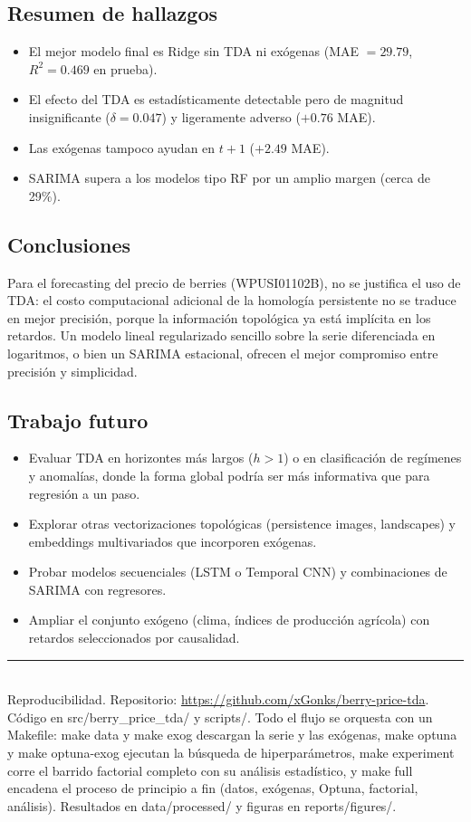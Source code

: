 \documentclass[11pt,a4paper]{article}
\begin{document}
\subsection*{Resumen de hallazgos}
\begin{itemize}[noitemsep]
  \item El mejor modelo final es Ridge sin TDA ni exógenas (MAE $=29.79$,
        $R^2=0.469$ en prueba).
  \item El efecto del TDA es estadísticamente detectable pero de magnitud
        insignificante ($\delta=0.047$) y ligeramente adverso ($+0.76$ MAE).
  \item Las exógenas tampoco ayudan en $t{+}1$ ($+2.49$ MAE).
  \item SARIMA supera a los modelos tipo RF por un amplio margen (cerca de 29\%).
\end{itemize}

\subsection*{Conclusiones}
Para el forecasting del precio de berries (WPUSI01102B), no se justifica el uso de
TDA: el costo computacional adicional de la homología persistente no se traduce en
mejor precisión, porque la información topológica ya está implícita en los
retardos. Un modelo lineal regularizado sencillo sobre la serie diferenciada en
logaritmos, o bien un SARIMA estacional, ofrecen el mejor compromiso entre
precisión y simplicidad.

\subsection*{Trabajo futuro}
\begin{itemize}[noitemsep]
  \item Evaluar TDA en horizontes más largos ($h>1$) o en clasificación de
        regímenes y anomalías, donde la forma global podría ser más informativa
        que para regresión a un paso.
  \item Explorar otras vectorizaciones topológicas (persistence images,
        landscapes) y embeddings multivariados que incorporen exógenas.
  \item Probar modelos secuenciales (LSTM o Temporal CNN) y combinaciones de
        SARIMA con regresores.
  \item Ampliar el conjunto exógeno (clima, índices de producción agrícola) con
        retardos seleccionados por causalidad.
\end{itemize}

\vspace{1em}
\noindent\rule{\textwidth}{0.4pt}\\[2pt]
\small
Reproducibilidad. Repositorio:
\url{https://github.com/xGonks/berry-price-tda}. Código en src/berry\_price\_tda/
y scripts/. Todo el flujo se orquesta con un Makefile: make data y make exog
descargan la serie y las exógenas, make optuna y make optuna-exog ejecutan la
búsqueda de hiperparámetros, make experiment corre el barrido factorial completo
con su análisis estadístico, y make full encadena el proceso de principio a fin
(datos, exógenas, Optuna, factorial, análisis). Resultados en data/processed/ y
figuras en reports/figures/.
\end{document}
